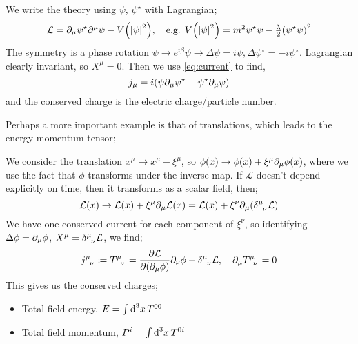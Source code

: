 \begin{examplebox}
We write the theory using $\psi$, $\psi^{\star}$ with Lagrangian;
\begin{equation}
\mathcal{L} = \del_\mu \psi^{\star} \del^\mu \psi - V\left( \left| \psi \right|^2 \right), \quad \textrm{e.g. } V\left( \left| \psi \right|^2 \right) = m^2 \psi^{\star} \psi - \tfrac{\lambda}{2}\left( \psi^{\star} \psi \right)^2
\end{equation}
The symmetry is a phase rotation $\psi \rightarrow e^{i \beta} \psi \rightarrow \Delta \psi = i \psi, \Delta \psi^{\star} = - i \psi^{\star}$. Lagrangian clearly invariant, so $X^{\mu} = 0$. Then we use \eqref{eq:current} to find,
\begin{equation}
j_\mu = i \left(\psi \del_\mu \psi^{\star} - \psi^{\star} \del_\mu \psi \right)
\end{equation}
and the conserved charge is the electric charge/particle number. 
\end{examplebox}
Perhaps a more important example is that of translations, which leads to the energy-momentum tensor;
\begin{examplebox}
We consider the translation $x^\mu \rightarrow x^\mu - \xi^\mu$, so $\phi(x) \rightarrow \phi(x) + \xi^\mu \partial_\mu \phi(x)$, where we use the fact that $\phi$ transforms under the inverse map. If $\mathcal{L}$ doesn't depend explicitly on time, then it transforms as a scalar field, then;
\begin{equation}
\mathcal{L}(x) \rightarrow \mathcal{L}(x) + \xi^\mu \del_\mu \mathcal{L} (x) = \mathcal{L}(x) + \xi^\nu \del_\mu \left( \delta\indices{^\mu_\nu}\mathcal{L}\right)
\end{equation}
We have one conserved current for each component of $\xi^\nu$, so identifying $\Delta \phi = \partial_\mu \phi$, $X^\mu = \delta\indices{^\mu_\nu}\mathcal{L}$, we find;
\begin{equation}
j\indices{^\mu_\nu} \coloneqq T\indices{^\mu_\nu} = \frac{\del \mathcal{L}}{\del \left( \del_\mu \phi \right)}\del_\nu \phi - \delta\indices{^\mu_\nu}\mathcal{L}, \quad \del_\mu T\indices{^\mu_\nu} = 0
\end{equation}
This gives us the conserved charges;
\begin{itemize}
\item Total field energy, $E = \int{\text{d}^3 x \,} T^{00}$
\item Total field momentum, $P^{i} = \int{\text{d}^3 x \,} T^{0i}$
\end{itemize}
\end{examplebox}
\newpage
